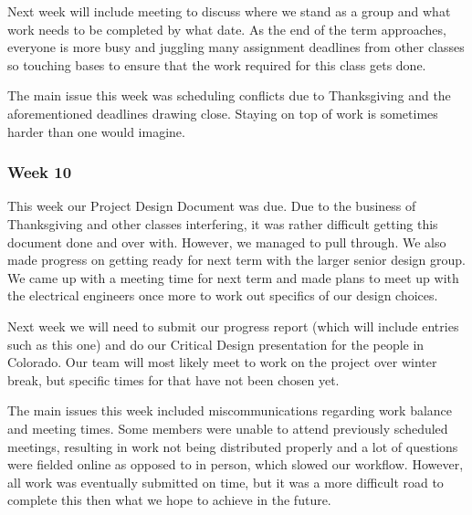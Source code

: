 \documentclass[letterpaper,10pt]{article}
\begin{document}
Next week will include meeting to discuss where we stand as a group and what work needs to be completed by what date.
As the end of the term approaches, everyone is more busy and juggling many assignment deadlines from other classes
so touching bases to ensure that the work required for this class gets done.

The main issue this week was scheduling conflicts due to Thanksgiving and the aforementioned deadlines drawing
close. Staying on top of work is sometimes harder than one would imagine.

\subsubsection{Week 10}
This week our Project Design Document was due. Due to the business of Thanksgiving and other classes interfering, 
it was rather difficult getting this document done and over with. However, we managed to pull through. We also
made progress on getting ready for next term with the larger senior design group. We came up with a meeting time
for next term and made plans to meet up with the electrical engineers once more to work out specifics
of our design choices.

Next week we will need to submit our progress report (which will include entries such as this one) and do
our Critical Design presentation for the people in Colorado. Our team will most likely meet to work on the
project over winter break, but specific times for that have not been chosen yet.

The main issues this week included miscommunications regarding work balance and meeting times. Some
members were unable to attend previously scheduled meetings, resulting in work not being distributed
properly and a lot of questions were fielded online as opposed to in person, which slowed our workflow.
However, all work was eventually submitted on time, but it was a more difficult road to complete this then
what we hope to achieve in the future.
\end{document}
